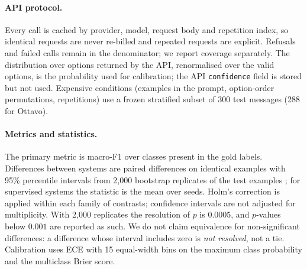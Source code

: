 \paragraph{API protocol.} Every call is cached by provider, model, request body and repetition index, so identical requests are never
re-billed and repeated requests are explicit. Refusals and failed calls remain in the denominator; we report coverage separately. The
distribution over options returned by the API, renormalised over the valid options, is the probability used for calibration; the API
\texttt{confidence} field is stored but not used. Expensive conditions (examples in the prompt, option-order permutations, repetitions)
use a frozen stratified subset of 300 test messages (288 for Ottavo).

\paragraph{Metrics and statistics.} The primary metric is macro-F1 over classes present in the gold labels. Differences between systems
are paired differences on identical examples with 95\% percentile intervals from 2{,}000 bootstrap replicates of the test examples
\citep{efron1993bootstrap}; for supervised systems the statistic is the mean over seeds. Holm's correction \citep{holm1979} is applied
within each family of contrasts; confidence intervals are not adjusted for multiplicity. With 2{,}000 replicates the resolution of
$p$ is $0.0005$, and $p$-values below $0.001$ are reported as such. We do not claim equivalence for non-significant differences: a
difference whose interval includes zero is \emph{not resolved}, not a tie. Calibration uses ECE with 15
equal-width bins on the maximum class probability and the multiclass Brier score.
